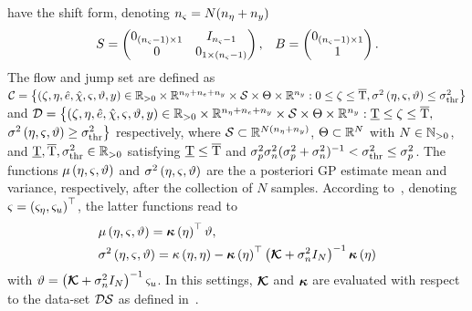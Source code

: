 have the shift form, denoting $n_{\varsigma} = N(n_{\eta} + n_{y})$
\begin{equation*}
   \begin{matrix}
      S = 
      \begin{pmatrix}
         0_{(n_{\varsigma}-1) \times 1} & I_{n_{\varsigma}-1} \\
         0 & 0_{1 \times (n_{\varsigma}-1)}
      \end{pmatrix}, &
      B = 
      \begin{pmatrix}
         0_{(n_{\varsigma}-1) \times 1} \\ 1
      \end{pmatrix}.
   \end{matrix}
\end{equation*}
The flow and jump set are defined as
$\mathcal{C} = \big\{(\zeta, \eta, \hat{e}, \hat{\chi}, \varsigma, \vartheta, y) \in \mathbb{R}_{>0} \times \mathbb{R}^{n_{\eta} + n_{e} + n_{y}} \times \mathcal{S} \times \Theta \times \mathbb{R}^{n_{y}} : 0 \le \zeta \le \overline{\text{T}}, \sigma^2 \left( \eta, \varsigma, \vartheta \right) \le \sigma^2_{\text{thr}} \big\}$
and
$\mathcal{D} = \big\{(\zeta, \eta, \hat{e}, \hat{\chi}, \varsigma, \vartheta, y) \in \mathbb{R}_{>0} \times \mathbb{R}^{n_{\eta} + n_{e} + n_{y}} \times \mathcal{S} \times \Theta \times \mathbb{R}^{n_{y}} : \underline{\text{T}} \le \zeta \le \overline{\text{T}},$ $\sigma^2 \left( \eta, \varsigma, \vartheta \right) \ge \sigma^2_{\text{thr}} \big\}$
respectively, where $\mathcal{S} \subset \mathbb{R}^{N(n_{\eta}+n_{y})}$, $\Theta \subset \mathbb{R}^{N}$ with $N \in \mathbb{N}_{>0}$, and $\underline{\text{T}}, \overline{\text{T}}, \sigma^2_{\text{thr}} \in \mathbb{R}_{>0}$ satisfying $\underline{\text{T}} \le \overline{\text{T}}$ and $\sigma_p^2\sigma_n^2(\sigma_p^2 + \sigma_n^2)^{-1} < \sigma^2_{\text{thr}} \le \sigma_p^2$.
The functions $\mu \left( \eta, \varsigma, \vartheta \right)$ and $\sigma^2 \left( \eta, \varsigma, \vartheta \right)$ are the a posteriori GP estimate mean and variance, respectively, after the collection of
$N$ samples. According to~, denoting $\varsigma = \left( \varsigma_{\eta}, \varsigma_{u} \right)^{\top}$, the latter functions read to
\begin{equation*}
	\begin{split}
		& \mu \left( \eta, \varsigma, \vartheta \right) = \boldsymbol{\kappa} \left( \eta \right)^{\top} \vartheta, \\
		& \sigma^2 \left( \eta, \varsigma, \vartheta \right) = \kappa \left( \eta, \eta \right) - \boldsymbol{\kappa} \left( \eta \right)^{\top} \left( \boldsymbol{\mathcal{K}} + \sigma_n^2 I_{N} \right)^{-1} \boldsymbol{\kappa} \left( \eta \right)
	\end{split}
\end{equation*}
with $\vartheta = \left( \boldsymbol{\mathcal{K}} + \sigma_n^2 I_{N} \right)^{-1} \varsigma_{u}$.
In this settings, $\boldsymbol{\mathcal{K}}$ and $\boldsymbol{\kappa}$ are evaluated with respect to the data-set $\mathcal{DS}$ as defined in~.
